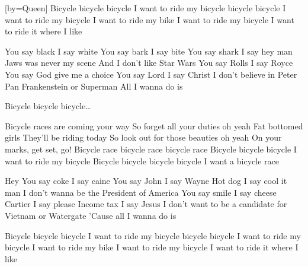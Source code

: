 [by={Queen}]
\beginchorus
Bicycle bicycle bicycle
I want to ride my bicycle bicycle bicycle
I want to ride my bicycle
I want to ride my bike
I want to ride my bicycle
I want to ride it where I like
\endchorus 

\beginverse 
You say black I say white
You say bark I say bite
You say shark I say hey man
Jaws was never my scene
And I don't like Star Wars
You say Rolls I say Royce
You say God give me a choice
You say Lord I say Christ
I don't believe in Peter Pan
Frankenstein or Superman
All I wanna do is
\endverse

\beginchorus
Bicycle bicycle bicycle\dots
\endchorus 

\beginverse 
Bicycle races are coming your way
So forget all your duties oh yeah
Fat bottomed girls
They'll be riding today
So look out for those beauties oh yeah
On your marks, get set, go!
Bicycle race bicycle race bicycle race
Bicycle bicycle bicycle
I want to ride my bicycle
Bicycle bicycle bicycle bicycle
I want a bicycle race
\endverse

\beginverse
Hey
You say coke I say caine
You say John I say Wayne
Hot dog I say cool it man
I don't wanna be the President of America
You say smile I say cheese
Cartier I say please
Income tax I say Jesus
I don't want to be a candidate for
Vietnam or Watergate
'Cause all I wanna do is
\endverse

\beginchorus
Bicycle  bicycle  bicycle
I want to ride my bicycle bicycle  bicycle
I want to ride my bicycle
I want to ride my bike
I want to ride my bicycle
I want to ride it where I like
\endchorus 
\endsong

